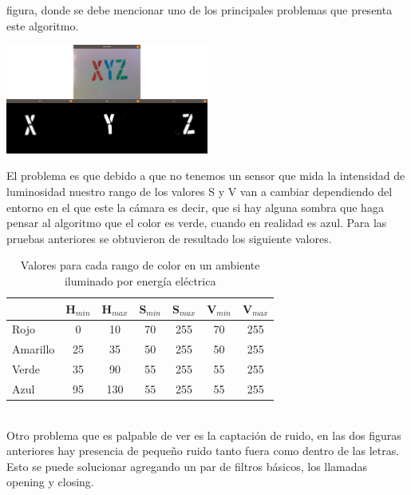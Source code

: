 figura, donde se debe mencionar uno de los principales problemas que presenta este algoritmo.
\begin{center}
	\includegraphics[width=0.5\textwidth]{Contenido/Cuerpo/Capitulo4/Fig8.eps}
	\label{Fig9}
\end{center}
El problema es que debido a que no tenemos un sensor que mida la intensidad de luminosidad
nuestro rango de los valores S y V van a cambiar dependiendo del entorno en el que este la cámara
es decir, que si hay alguna sombra que haga pensar al algoritmo que el color es verde, cuando en
realidad es azul.
Para las pruebas anteriores se obtuvieron de resultado los siguiente valores.\\
\begin{table}[ht]
	\begin{center}
		\caption{Valores para cada rango de color en un ambiente iluminado por energía eléctrica}
		\begin{tabular}[t]{lcccccc}
			\hline
			         & H$_{min}$ & H$_{max}$ & S$_{min}$ & S$_{max}$ & V$_{min}$ & V$_{max}$ \\
			\hline
			Rojo     & 0         & 10        & 70        & 255       & 70        & 255       \\
			Amarillo & 25        & 35        & 50        & 255       & 50        & 255       \\
			Verde    & 35        & 90        & 55        & 255       & 55        & 255       \\
			Azul     & 95        & 130       & 55        & 255       & 55        & 255       \\
			\hline
		\end{tabular}
	\end{center}
\end{table}\\
Otro problema que es palpable de ver es la captación de ruido, en las dos figuras anteriores
hay presencia de pequeño ruido tanto fuera como dentro de las letras. Esto se puede solucionar
agregando un par de filtros básicos, los llamadas opening y closing.


